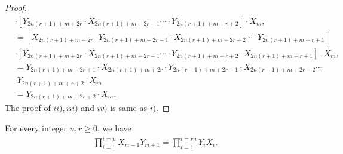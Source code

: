 \begin{proof}
\begin{align*}
&\cdot\left[Y_{2n(r+1)+m+2r}\cdot X_{2n(r+1)+m+2r-1}\cdots\cdot Y_{2n(r+1)+m+r+2}\right]\cdot X_{m},\\
&=\left[X_{2n(r+1)+m+2r}\cdot Y_{2n(r+1)+m+2r-1}\cdot X_{2n(r+1)+m+2r-2}\cdots\cdot Y_{2n(r+1)+m+r+1}\right]\\
&\cdot\left[Y_{2n(r+1)+m+2r}\cdot X_{2n(r+1)+m+2r-1}\cdots\cdot Y_{2n(r+1)+m+r+2}\cdot X_{2n(r+1)+m+r+1}\right]\cdot X_{m},\\
&=Y_{2n(r+1)+m+2r+1}\cdot X_{2n(r+1)+m+2r}\cdot Y_{2n(r+1)+m+2r-1}\cdot X_{2n(r+1)+m+2r-2}\cdots\\&\cdot Y_{2n(r+1)+m+r+2}\cdot X_{m}\\
&=Y_{2n(r+1)+m+2r+2}\cdot X_{m}.
\end{align*}
The proof of $ii), iii)$ and $iv)$ is same as $i)$.
\end{proof}
\begin{theorem} For every integer $n, r\geq0$, we have
\begin{align}
\displaystyle\prod_{i=1}^{i=n}X_{ri+1} Y_{ri+1}=\displaystyle\prod_{i=1}^{i=rn}Y_{i} X_{i}.
\end{align}
\end{theorem}
